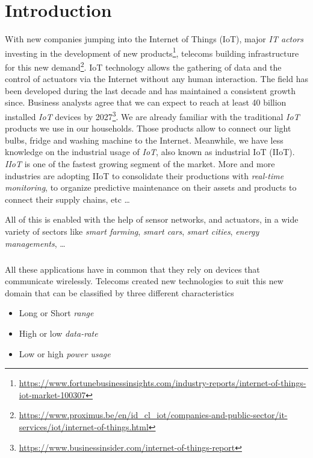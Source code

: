 \chapter{Introduction}

With new companies jumping into the Internet of Things (IoT), 
major \emph{IT actors} investing in the development of new
products\footnote{\url{https://www.fortunebusinessinsights.com/industry-reports/internet-of-things-iot-market-100307}},
 telecoms building infrastructure for this new 
demand\footnote{\url{https://www.proximus.be/en/id_cl_iot/companies-and-public-sector/it-services/iot/internet-of-things.html}}.
IoT technology allows the gathering of data and the control of actuators via
the Internet without any human interaction.
The field has been developed during the last decade and has maintained a
consistent growth since.
Business analysts agree that we can expect to reach at least 40 billion
installed \emph{IoT} devices by
2027\footnote{\url{https://www.businessinsider.com/internet-of-things-report}}. 
We are already familiar with the traditional \emph{IoT} products
we use in our households. Those products allow to connect our light bulbs, fridge and
washing machine to the Internet.
Meanwhile, we have less knowledge on the industrial usage of \emph{IoT}, also
known as industrial IoT (IIoT). \emph{IIoT} is one of the fastest growing
segment of the market.
More and more industries are adopting IIoT to consolidate their productions
with \emph{real-time monitoring}, to organize predictive maintenance on their
assets and products to connect their supply chains, etc \ldots

All of this is enabled with the help of sensor networks, and actuators, in a
wide variety of sectors like \emph{smart farming}, \emph{smart cars},
\emph{smart cities}, \emph{energy managements}, \ldots

\paragraph{}

All these applications have in common that they rely on devices that
communicate wirelessly.
Telecoms created new technologies to suit this new domain that can be
classified by three different characteristics

\begin{itemize}
    \item Long or Short \emph{range}
    \item High or low \emph{data-rate}
    \item Low or high \emph{power usage} 
\end{itemize}

